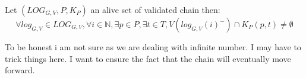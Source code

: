 \begin{myprop*}
	Let $(LOG_{G,V},P,K_P)$ an alive set of validated chain then:
	$$\forall log_{G,V} \in LOG_{G,V}, \forall i \in \mathbb{N}, \exists p \in P, \exists t \in T , V(log_{G,V}(i)^-) \cap K_P(p,t) \neq \emptyset $$
\end{myprop*}
\begin{myrem}
	To be honest i am not sure as we are dealing with infinite number. I may have to trick things here. I want to ensure the fact that the chain will eventually move forward.
\end{myrem}
